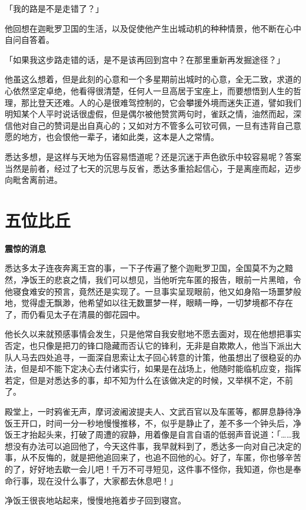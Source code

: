 \documentclass[12pt,twoside,openany]{book}
\newcommand{\mt}[1]{\textbullet \textbf{#1}}
\begin{document}
「我的路是不是走错了？」

他回想在迦毗罗卫国的生活，以及促使他产生出城动机的种种情景，他不断在心中自问自答着。

「如果我这步路走错的话，是不是该再回到宫中？在那里重新再发掘途径？」

他虽这么想着，但是此刻的心意和一个多星期前出城时的心意，全无二致，求道的心依然坚定卓绝，他看得很清楚，任何人一旦高居于宝座上，而要想悟到人生的哲理，那比登天还难。人的心是很难驾控制的，它会攀援外境而迷失正道，譬如我们明知某个人平时说话很虚假，但是偶尔被他赞赏两句时，雀跃之情，油然而起，深信他对自己的赞词是出自真心的；又如对方不管多么可钦可佩，一旦有违背自己意愿的地方，也会恨他一辈子，诸如此类，这本是人之常情。

悉达多想，是这样与天地为伍容易悟道呢？还是沉迷于声色欲乐中较容易呢？答案当然是前者，经过了七天的沉思与反省，悉达多重拾起信心，于是离座而起，迈步向毗舍离前进。

\section{五位比丘}\label{sec1.3}

\mt{震惊的消息}

悉达多太子连夜奔离王宫的事，一下子传遍了整个迦毗罗卫国，全国莫不为之黯然，净饭王的悲哀之情，我们可以想见，当他听完车匿的报告，眼前一片黑暗，令他寝食难安的预言，竟然还是实现了。一旦事实呈现眼前，他又如身陷一场噩梦般地，觉得虚无飘渺，他希望如以往无数噩梦一样，眼睛一睁，一切梦境都不存在了，而仍看见太子在清晨的御花园中。

他长久以来就预感事情会发生，只是他常自我安慰地不愿去面对，现在他想把事实否定，也只像是把刀的锋口隐藏而否认它的锋利，无非是自欺欺人，他当下派出大队人马去四处追寻，一面深自思索让太子回心转意的计策，他虽想出了很稳妥的办法，但是却不能下定决心去付诸实行，如果是在战场上，他随时能临机应变，指挥若定，但是对悉达多的事，却不知为什么在该做决定的时候，又举棋不定，不前了。

殿堂上，一时鸦雀无声，摩诃波阇波提夫人、文武百官以及车匿等，都屏息静待净饭王开口，时间一分一秒地慢慢推移，不，似乎是静止了，差不多一个钟头后，净饭王才抬起头来，打破了周遭的寂静，用着像是自言自语的低弱声音说道：「……我想没有办法可以追回他了，今天这件事，我早就料到了，悉达多一向对自己决定的事，从不反悔的，就是把他追回来了，也追不回他的心。好了，车匿，你也够辛苦的了，好好地去歇一会儿吧！千万不可寻短见，这件事不怪你，我知道，你也是奉命行事，现在没什么事了，大家都去休息吧！」

净饭王很丧地站起来，慢慢地拖着步子回到寝宫。
\end{document}

